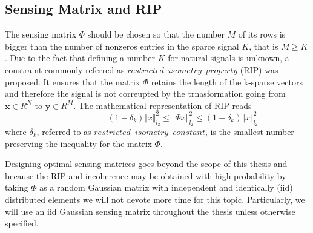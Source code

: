 \subsection{Sensing Matrix and RIP}
The sensing matrix $\Phi$ should be chosen so that the number $M$ of its rows is bigger than the number of nonzeros entries in the sparce signal $K$, that is $M \geq K$. Due to the fact that defining a number $K$ for natural signals is unknown, a constraint commonly referred as $restricted \enspace isometry \enspace property$ (RIP) \cite{candes2005decoding,candes2006stable,candes2008restricted} was proposed. It ensures that the matrix $\Phi$ retains the length of the k-sparse vectors and therefore the signal is not correupted  by the trnasformation going from $\mathbf{x} \in R^N $ to $\mathbf{y} \in R^M $. The mathematical representation of RIP reads
\begin{equation} \label{eq:rip1}
\hspace{3em} \hspace{3em} \hspace{3em} (1-\delta_k)\Vert x \Vert_{l_2}^2 \leq \Vert \Phi x \Vert_{l_2}^2 \leq (1+\delta_k)\Vert x \Vert_{l_2}^2  \hspace{3em}
\end{equation}  
where $\delta_k$, referred to as $restricted \enspace isometry \enspace constant$, is the smallest number preserving the inequality for the matrix $\Phi$. \

Designing optimal sensing matrices goes beyond the scope of this thesis and because the RIP and incoherence may be obtained with high probability by taking $\Phi$ as a random Gaussian matrix with independent and identically (iid) distributed elements\cite{candes2005signal} we will not devote more time for this topic. Particularly, we will use an iid Gaussian sensing matrix throughout the thesis unless otherwise specified.         


